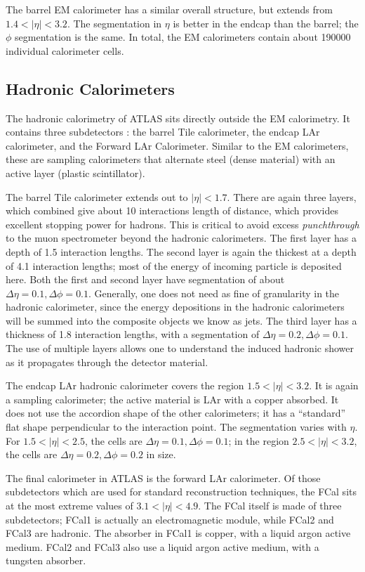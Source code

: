 The barrel EM calorimeter has a similar overall structure, but extends from $1.4 < |\eta| < 3.2$.
The segmentation in $\eta$ is better in the endcap than the barrel; the $\phi$ segmentation is the same.
In total, the EM calorimeters contain about 190000 individual calorimeter cells.


\subsection{Hadronic Calorimeters}

The hadronic calorimetry of ATLAS sits directly outside the EM calorimetry.
It contains three subdetectors : the barrel Tile calorimeter, the endcap LAr calorimeter, and the Forward  LAr Calorimeter.
Similar to the EM calorimeters, these are sampling calorimeters that alternate steel (dense material) with an active layer (plastic scintillator).

The barrel Tile calorimeter extends out to $|\eta| < 1.7$.
There are again three layers, which combined give about 10 interactions length of distance, which provides excellent stopping power for hadrons.
This is critical to avoid excess \textit{punchthrough} to the muon spectrometer beyond the hadronic calorimeters.
The first layer has a depth of 1.5 interaction lengths.
The second layer is again the thickest at a depth of 4.1 interaction lengths; most of the energy of incoming particle is deposited here.
Both the first and second layer have segmentation of about $\Delta\eta = 0.1, \Delta\phi = 0.1$.
Generally, one does not need as fine of granularity in the hadronic calorimeter, since the energy depositions in the hadronic calorimeters will be summed into the composite objects we know as jets.
The third layer has a thickness of 1.8 interaction lengths, with a segmentation of $\Delta\eta = 0.2, \Delta\phi = 0.1$.
The use of multiple layers allows one to understand the induced hadronic shower as it propagates through the detector material.

The endcap LAr hadronic calorimeter covers the region $1.5 < |\eta| < 3.2$.
It is again a sampling calorimeter; the active material is LAr with a copper absorbed.
It does not use the accordion shape of the other calorimeters; it has a ``standard'' flat shape perpendicular to the interaction point.
The segmentation varies with $\eta$.
For $1.5 < |\eta| < 2.5 $, the cells are $\Delta\eta = 0.1, \Delta\phi = 0.1$; in the region $2.5 < |\eta | < 3.2$, the cells are $\Delta\eta = 0.2, \Delta\phi = 0.2$ in size.

The final calorimeter in ATLAS is the forward LAr calorimeter.
Of those subdetectors which are used for standard reconstruction techniques, the FCal sits at the most extreme values of $ 3.1 < |\eta| < 4.9$.
The FCal itself is made of three subdetectors; FCal1 is actually an electromagnetic module, while FCal2 and FCal3 are hadronic.
The absorber in FCal1 is copper, with a liquid argon active medium.
FCal2 and FCal3 also use a liquid argon active medium, with a tungsten absorber.

